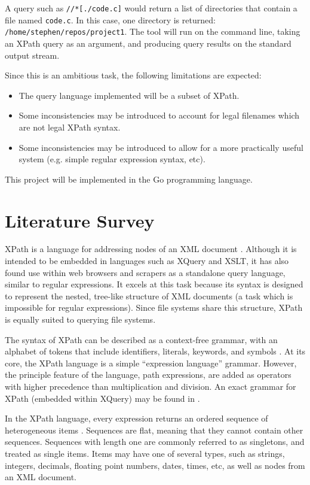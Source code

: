 \documentclass{scrartcl}
\begin{document}
A query such as \texttt{//*[./code.c]} would return a list of directories that
contain a file named \texttt{code.c}. In this case, one directory is returned:
\texttt{/home/stephen/repos/project1}. The tool will run on the command line,
taking an XPath query as an argument, and producing query results on the
standard output stream.

Since this is an ambitious task, the following limitations are expected:

\begin{itemize}
\item The query language implemented will be a subset of XPath.
\item Some inconsistencies may be introduced to account for legal filenames
  which are not legal XPath syntax.
\item Some inconsistencies may be introduced to allow for a more practically
  useful system (e.g. simple regular expression syntax, etc).
\end{itemize}

This project will be implemented in the Go programming language.

\section{Literature Survey}

XPath is a language for addressing nodes of an XML document \cite{xpath}.
Although it is intended to be embedded in languages such as XQuery and XSLT, it
has also found use within web browsers and scrapers as a standalone query
language, similar to regular expressions. It excels at this task because its
syntax is designed to represent the nested, tree-like structure of XML documents
(a task which is impossible for regular expressions). Since file systems share
this structure, XPath is equally suited to querying file systems.

The syntax of XPath can be described as a context-free grammar, with an alphabet
of tokens that include identifiers, literals, keywords, and symbols
\cite{xpath}. At its core, the XPath language is a simple ``expression
language'' grammar. However, the principle feature of the language, path
expressions, are added as operators with higher precedence than multiplication
and division. An exact grammar for XPath (embedded within XQuery) may be found
in \cite{xpath}.

In the XPath language, every expression returns an ordered sequence of
heterogeneous items \cite{xpath-datamodel}. Sequences are flat, meaning that
they cannot contain other sequences. Sequences with length one are commonly
referred to as singletons, and treated as single items. Items may have one of
several types, such as strings, integers, decimals, floating point numbers,
dates, times, etc, as well as nodes from an XML document.
\end{document}
